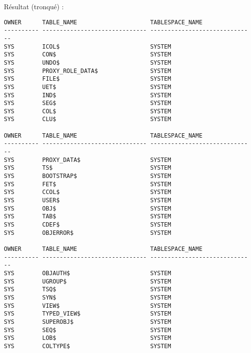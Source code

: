Résultat (tronqué) :
\begin{verbatim}
OWNER      TABLE_NAME                     TABLESPACE_NAME               
---------- ------------------------------ ------------------------------
SYS        ICOL$                          SYSTEM                        
SYS        CON$                           SYSTEM                        
SYS        UNDO$                          SYSTEM                                
SYS        PROXY_ROLE_DATA$               SYSTEM                                
SYS        FILE$                          SYSTEM                                
SYS        UET$                           SYSTEM                                
SYS        IND$                           SYSTEM                                
SYS        SEG$                           SYSTEM                                
SYS        COL$                           SYSTEM                                
SYS        CLU$                           SYSTEM

OWNER      TABLE_NAME                     TABLESPACE_NAME                       
---------- ------------------------------ ------------------------------                                        
SYS        PROXY_DATA$                    SYSTEM                                
SYS        TS$                            SYSTEM                                
SYS        BOOTSTRAP$                     SYSTEM                                
SYS        FET$                           SYSTEM                                
SYS        CCOL$                          SYSTEM                                
SYS        USER$                          SYSTEM                                
SYS        OBJ$                           SYSTEM                                
SYS        TAB$                           SYSTEM                                
SYS        CDEF$                          SYSTEM                                
SYS        OBJERROR$                      SYSTEM                               

OWNER      TABLE_NAME                     TABLESPACE_NAME                       
---------- ------------------------------ ------------------------------        
SYS        OBJAUTH$                       SYSTEM                                
SYS        UGROUP$                        SYSTEM                                
SYS        TSQ$                           SYSTEM                                
SYS        SYN$                           SYSTEM                                
SYS        VIEW$                          SYSTEM                                
SYS        TYPED_VIEW$                    SYSTEM                                
SYS        SUPEROBJ$                      SYSTEM                                
SYS        SEQ$                           SYSTEM                                
SYS        LOB$                           SYSTEM                                
SYS        COLTYPE$                       SYSTEM                                


\end{verbatim}
